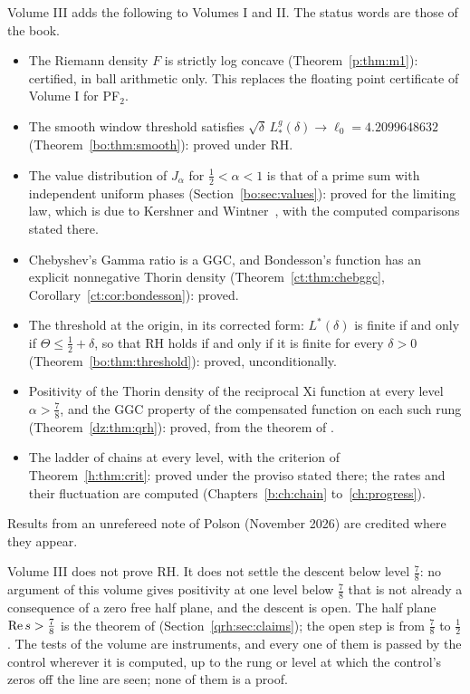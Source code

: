 Volume III adds the following to Volumes I and II. The status words are those of the book.
\begin{itemize}
\item The Riemann density $F$ is strictly log concave (Theorem~\ref{p:thm:m1}): certified, in ball arithmetic only. This replaces the floating point certificate of Volume I for PF$_2$.
\item The smooth window threshold satisfies $\sqrt\delta\,L^g_*(\delta)\to\ell_0=4.2099648632$ (Theorem~\ref{bo:thm:smooth}): proved under RH.
\item The value distribution of $J_\alpha$ for $\frac12<\alpha<1$ is that of a prime sum with independent uniform phases (Section~\ref{bo:sec:values}): proved for the limiting law, which is due to Kershner and Wintner~\cite{KershnerWintner37}, with the computed comparisons stated there.
\item Chebyshev's Gamma ratio is a GGC, and Bondesson's function has an explicit nonnegative Thorin density (Theorem~\ref{ct:thm:chebggc}, Corollary~\ref{ct:cor:bondesson}): proved.
\item The threshold at the origin, in its corrected form: $L^*(\delta)$ is finite if and only if $\Theta\le\frac12+\delta$, so that RH holds if and only if it is finite for every $\delta>0$ (Theorem~\ref{bo:thm:threshold}): proved, unconditionally.
\item Positivity of the Thorin density of the reciprocal Xi function at every level $\alpha>\frac78$, and the GGC property of the compensated function on each such rung (Theorem~\ref{dz:thm:qrh}): proved, from the theorem of \cite{OAI26a}.
\item The ladder of chains at every level, with the criterion of Theorem~\ref{h:thm:crit}: proved under the proviso stated there; the rates and their fluctuation are computed (Chapters~\ref{b:ch:chain} to~\ref{ch:progress}).
\end{itemize}
Results from an unrefereed note of Polson (November 2026) are credited where they appear.

Volume III does not prove RH. It does not settle the descent below level $\frac78$: no argument of this volume gives positivity at one level below $\frac78$ that is not already a consequence of a zero free half plane, and the descent is open. The half plane $\operatorname{Re} s>\frac78$ is the theorem of \cite{OAI26a} (Section~\ref{qrh:sec:claims}); the open step is from $\frac78$ to $\frac12$. The tests of the volume are instruments, and every one of them is passed by the control wherever it is computed, up to the rung or level at which the control's zeros off the line are seen; none of them is a proof.
